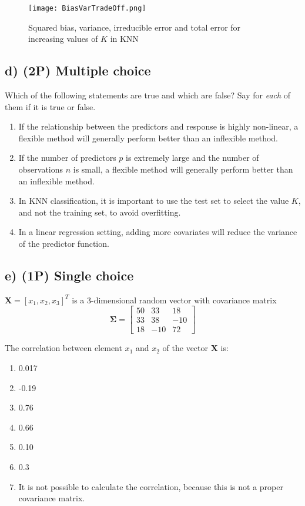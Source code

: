 \documentclass[
]{article}
\providecommand{\tightlist}{%
  \setlength{\itemsep}{0pt}\setlength{\parskip}{0pt}}
\begin{document}
\begin{figure}
\centering
\texttt{[image: BiasVarTradeOff.png]}
\caption{Squared bias, variance, irreducible error and total error for
increasing values of \(K\) in KNN}
\end{figure}

\hypertarget{d-2p-multiple-choice}{%
\subsection{d) (2P) Multiple choice}\label{d-2p-multiple-choice}}

Which of the following statements are true and which are false? Say for
\emph{each} of them if it is true or false.

\begin{enumerate}
\def\labelenumi{(\roman{enumi})}
\tightlist
\item
  If the relationship between the predictors and response is highly
  non-linear, a flexible method will generally perform better than an
  inflexible method.
\item
  If the number of predictors \(p\) is extremely large and the number of
  observations \(n\) is small, a flexible method will generally perform
  better than an inflexible method.
\item
  In KNN classification, it is important to use the test set to select
  the value \(K\), and not the training set, to avoid overfitting.
\item
  In a linear regression setting, adding more covariates will reduce the
  variance of the predictor function.
\end{enumerate}

\hypertarget{e-1p-single-choice}{%
\subsection{e) (1P) Single choice}\label{e-1p-single-choice}}

\(\mathbf{X} = [x_1, x_2, x_3]^T\) is a 3-dimensional random vector with
covariance matrix \[
\boldsymbol{\Sigma} = \begin{bmatrix}
  50 & 33 & 18 \\
  33 & 38 & -10 \\
  18 & -10  & 72
  \end{bmatrix}
\]

The correlation between element \(x_1\) and \(x_2\) of the vector
\(\mathbf{X}\) is:

\begin{enumerate}
\def\labelenumi{(\roman{enumi})}
\tightlist
\item
  0.017
\item
  -0.19
\item
  0.76
\item
  0.66
\item
  0.10
\item
  0.3
\item
  It is not possible to calculate the correlation, because this is not a
  proper covariance matrix.
\end{enumerate}
\end{document}
